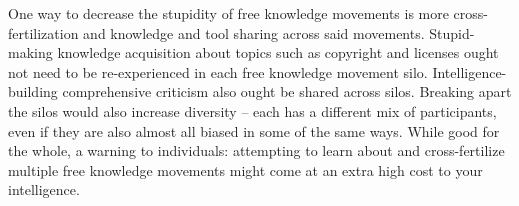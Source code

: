 One way to decrease the stupidity of free knowledge movements is more
cross-fertilization and knowledge and tool sharing across said
movements. Stupid-making knowledge acquisition about topics such as
copyright and licenses ought not need to be re-experienced in each free
knowledge movement silo. Intelligence-building comprehensive criticism
also ought be shared across silos. Breaking apart the silos would also
increase diversity -- each has a different mix of participants, even if
they are also almost all biased in some of the same ways. While good for
the whole, a warning to individuals: attempting to learn about and
cross-fertilize multiple free knowledge movements might come at an extra
high cost to your intelligence.
